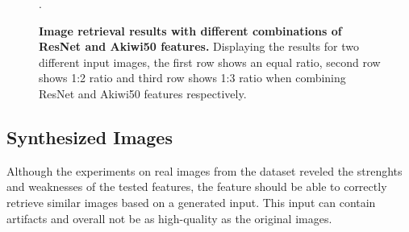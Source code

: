 \documentclass[12pt]{report}
\begin{document}
\begin{figure}[!h]
\centering
{}\hspace{0.2cm}
\caption{\label{fig:search_weights} \textbf{Image retrieval results with different combinations of ResNet and Akiwi50 features.} Displaying the results for two different input images, the first row shows an equal ratio, second row shows 1:2 ratio and third row shows 1:3 ratio when combining ResNet and Akiwi50 features respectively.}.
\end{figure}

\subsection{Synthesized Images}
Although the experiments on real images from the dataset reveled the strenghts and weaknesses of the tested features, the feature should be able to correctly retrieve similar images based on a generated input. This input can contain artifacts and overall not be as high-quality as the original images. 
\end{document}
